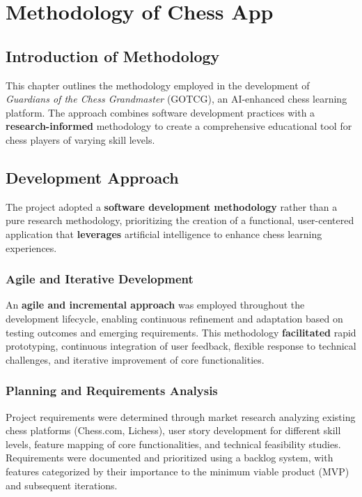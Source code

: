 \chapter{Methodology of Chess App}
\label{cha:methodology}

\section*{Introduction of Methodology}

This chapter outlines the methodology employed in the development of \textit{Guardians of the Chess Grandmaster} (GOTCG), an AI-enhanced chess learning platform. The approach combines software development practices with a \textbf{research-informed} methodology to create a comprehensive educational tool for chess players of varying skill levels.

\section{Development Approach}

The project adopted a \textbf{software development methodology} rather than a pure research methodology, prioritizing the creation of a functional, user-centered application that \textbf{leverages} artificial intelligence to enhance chess learning experiences.

\subsection*{Agile and Iterative Development}

An \textbf{agile and incremental approach} was employed throughout the development lifecycle, enabling continuous refinement and adaptation based on testing outcomes and emerging requirements. This methodology \textbf{facilitated} rapid prototyping, continuous integration of user feedback, flexible response to technical challenges, and iterative improvement of core functionalities.

\subsection*{Planning and Requirements Analysis}

Project requirements were determined through market research analyzing existing chess platforms (Chess.com, Lichess), user story development for different skill levels, feature mapping of core functionalities, and technical feasibility studies. Requirements were documented and prioritized using a backlog system, with features categorized by their importance to the minimum viable product (MVP) and subsequent iterations.

